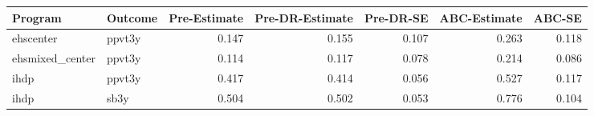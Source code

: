 \begin{table}[ht]
\centering
\begin{tabular}{llrrrrr}
  \hline
Program & Outcome & Pre-Estimate & Pre-DR-Estimate & Pre-DR-SE & ABC-Estimate & ABC-SE \\ 
  \hline
ehscenter & ppvt3y & 0.147 & 0.155 & 0.107 & 0.263 & 0.118 \\ 
  ehsmixed\_center & ppvt3y & 0.114 & 0.117 & 0.078 & 0.214 & 0.086 \\ 
  ihdp & ppvt3y & 0.417 & 0.414 & 0.056 & 0.527 & 0.117 \\ 
  ihdp & sb3y & 0.504 & 0.502 & 0.053 & 0.776 & 0.104 \\ 
   \hline
\end{tabular}
\end{table}
